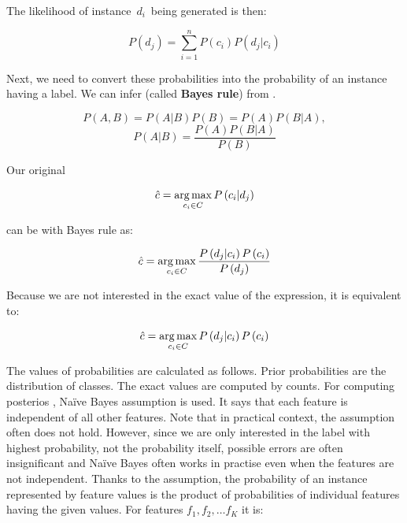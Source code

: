 The likelihood of instance~$d_i$~being generated is then:

\begin{equation}
	P\left(d_j\right) = \sum_{i=1}^{n}{
	P\left(c_i\right)
	P\left(d_j|c_i\right)
}
\end{equation}

Next, we need to convert these probabilities into the probability of an instance having a label.
We can infer  (called \textbf{Bayes rule}) from .

\begin{equation}
	\label{eq:bayesinfer}
	P\left(A,B\right) = 
	P\left(A|B\right)
	P\left(B\right) = 
	P\left(A\right)
	P\left(B|A\right),
\end{equation}
\begin{equation}
	\label{eq:bayesrule}
	P\left(A|B\right) =
	\frac{
	P\left(A\right)
P\left(B|A\right)}
{P\left(B\right)}
\end{equation}

Our original 

\begin{equation}
	\hat{c} = \operatorname*{arg\,max}_{c_i \in C} P\left(c_i  | d_j \right)
\end{equation}

can be  with Bayes rule as:

\begin{equation}
	\hat{c} = \operatorname*{arg\,max}_{c_i \in C}
	\frac{
	P\left(d_j  | c_i \right)
	P\left( c_i \right)
}{
	P\left( d_j \right)
}
\end{equation}

Because we are not interested in the exact value of the expression, it is equivalent to:

\begin{equation}
	\label{eq:classprb}
	\hat{c} = \operatorname*{arg\,max}_{c_i \in C}
	P\left(d_j  | c_i \right)
	P\left( c_i \right)
\end{equation}

The  values of probabilities are calculated as follows.
Prior probabilities  are the distribution of classes.
The exact values are computed by counts.
For computing posterios , Na\"{i}ve Bayes assumption is used.
It says that each feature is independent of all other features.
Note that in practical context, the assumption often does not hold.
However, since we are only interested in the label with  highest probability,
not the probability itself, possible errors are often insignificant and Na\"{i}ve Bayes often works in practise even when the features are not independent.
Thanks to the assumption, the probability of an instance represented by  feature values is the product
of probabilities of individual features having the given values.
For features $f_1, f_2, \dots f_K$\jh{,} it is:

